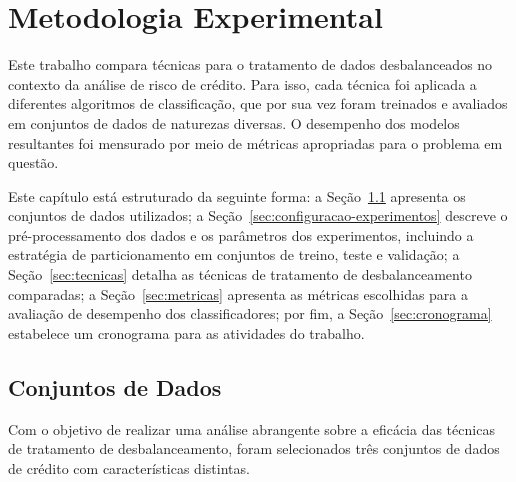 \chapter{Metodologia Experimental}\label{cap:ferramentas}

Este trabalho compara técnicas para o tratamento de dados desbalanceados no contexto da análise de risco de crédito. Para isso, cada técnica foi aplicada a diferentes algoritmos de classificação, que por sua vez foram treinados e avaliados em conjuntos de dados de naturezas diversas. O desempenho dos modelos resultantes foi mensurado por meio de métricas apropriadas para o problema em questão.

Este capítulo está estruturado da seguinte forma: a Seção~\ref{sec:datasets} apresenta os conjuntos de dados utilizados; a Seção~\ref{sec:configuracao-experimentos} descreve o pré-processamento dos dados e os parâmetros dos experimentos, incluindo a estratégia de particionamento em conjuntos de treino, teste e validação; a Seção~\ref{sec:tecnicas} detalha as técnicas de tratamento de desbalanceamento comparadas; a Seção~\ref{sec:metricas} apresenta as métricas escolhidas para a avaliação de desempenho dos classificadores; por fim, a Seção~\ref{sec:cronograma} estabelece um cronograma para as atividades do trabalho.

\section{Conjuntos de Dados}\label{sec:datasets}

Com o objetivo de realizar uma análise abrangente sobre a eficácia das técnicas de tratamento de desbalanceamento, foram selecionados três conjuntos de dados de crédito com características distintas.


